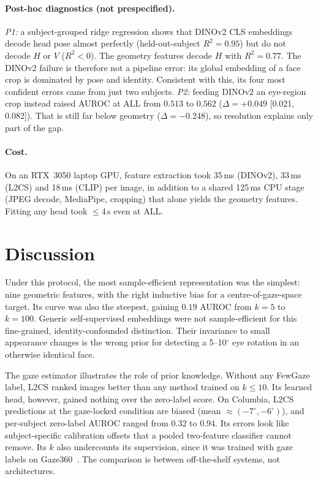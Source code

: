 \documentclass[10pt,twocolumn]{article}
\begin{document}
\paragraph{Post-hoc diagnostics (not prespecified).}
\emph{P1:} a subject-grouped ridge regression shows that DINOv2 CLS embeddings decode head pose almost perfectly
(held-out-subject $R^2{=}0.95$) but do not decode $H$ or $V$ ($R^2{<}0$). The geometry features decode
$H$ with $R^2{=}0.77$. The DINOv2 failure is therefore not a pipeline error: its global embedding of a
face crop is dominated by pose and identity. Consistent with this, its four most confident errors came from just two subjects.
\emph{P2:} feeding DINOv2 an eye-region crop instead raised AUROC at ALL from $0.513$ to $0.562$
($\Delta{=}{+}0.049$ [0.021, 0.082]). That is still far below geometry ($\Delta{=}{-}0.248$), so resolution
explains only part of the gap.

\paragraph{Cost.}
On an RTX~3050 laptop GPU, feature extraction took 35\,ms (DINOv2), 33\,ms (L2CS) and 18\,ms (CLIP) per image,
in addition to a shared 125\,ms CPU stage (JPEG decode, MediaPipe, cropping) that alone yields the geometry features.
Fitting any head took $\le$4\,s even at ALL.

\section{Discussion}
Under this protocol, the most sample-efficient representation was the simplest: nine geometric features, with
the right inductive bias for a centre-of-gaze-space target. Its curve was also the steepest, gaining
$0.19$ AUROC from $k{=}5$ to $k{=}100$. Generic self-supervised embeddings were not sample-efficient for this fine-grained,
identity-confounded distinction. Their invariance to small appearance changes is the wrong prior for detecting
a 5--10$^\circ$ eye rotation in an otherwise identical face.

The gaze estimator illustrates the role of prior knowledge. Without any FewGaze label, L2CS ranked images
better than any method trained on $k{\le}10$. Its learned head, however, gained nothing over the zero-label score.
On Columbia, L2CS predictions at the gaze-locked condition are biased (mean $\approx(-7^\circ,-6^\circ)$),
and per-subject zero-label AUROC ranged from $0.32$ to $0.94$. Its errors look like subject-specific
calibration offsets that a pooled two-feature classifier cannot remove. Its $k$ also undercounts its supervision,
since it was trained with gaze labels on Gaze360~\cite{kellnhofer2019gaze360}. The comparison is between
off-the-shelf systems, not architectures.
\end{document}
